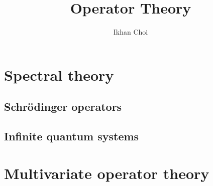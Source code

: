 \documentclass{../../large}
\begin{document}
\title{Operator Theory}
\author{Ikhan Choi}
\maketitle
\tableofcontents

\part{Spectral theory}
\chapter{Schr\"odinger operators}
\chapter{Infinite quantum systems}

\part{Multivariate operator theory}
\end{document}
